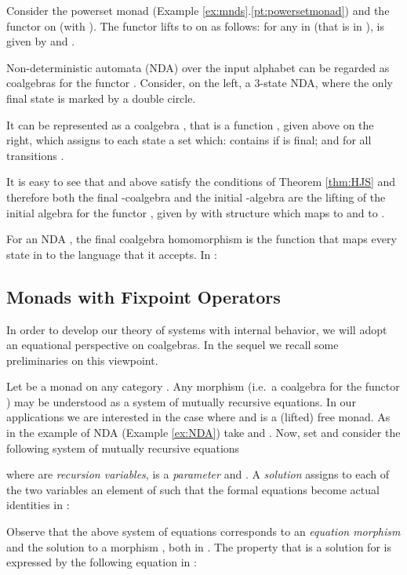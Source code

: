 \documentclass[oribibl,envcountsame,envcountsect,runningheads]{llncs}
\renewcommand{\>}{\rangle}
\begin{document}
\begin{example}[NDA]\label{ex:NDA} Consider the powerset monad  (Example \ref{ex:mnds}.\ref{pt:powersetmonad}) and the functor  on  (with ). The functor  lifts to  on  as follows: for any  in  (that is  in ),  is given by  and .

  Non-deterministic automata (NDA) over the input alphabet  can be
regarded as coalgebras for the functor
. Consider, on the left, a 3-state NDA, where the only final state is marked by a double circle.

  It can be represented as a coalgebra , that is a function , given above on the right, which assigns to each state  a set which: contains
 if  is final; and  for
all transitions .
\end{example}

It is easy to see that  and  above satisfy the conditions of Theorem \ref{thm:HJS} and therefore both the final -coalgebra and the initial -algebra are the lifting of the initial algebra for the functor , given by  with structure  which maps  to  and  to .

For an NDA , the final coalgebra homomorphism  is the function  that maps every state in  to the language that it accepts. In :



\subsection{Monads with Fixpoint Operators}\label{Sec:Elgot}

In order to develop our theory of systems with internal behavior, we will adopt an equational perspective on coalgebras. In the sequel we recall some preliminaries on this viewpoint.

Let  be a monad on any category . Any morphism  (i.e.~a coalgebra for the functor
) may be understood as a system of mutually recursive equations. In our
applications we are interested in the case where  and
  is a (lifted) free monad. As in the example of NDA (Example \ref{ex:NDA}) take  and . Now, set  and consider the following system of mutually
recursive equations

where  are \emph{recursion variables},  is a \emph{parameter} and . A \emph{solution} assigns to each
of the two variables  an element of  such that
the formal equations  become actual identities in :

Observe that the above system of equations corresponds to an \emph{equation morphism}  and the solution to a morphism , both in . The property that  is a solution for  is expressed by the following equation in :
\end{document}
